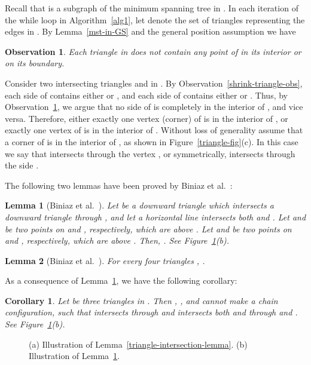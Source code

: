 \documentclass[11pt,a4paper]{article}
\newtheorem{lemma}{Lemma}
\newtheorem{corollary}{Corollary}
\newtheorem{observation}{Observation}
\begin{document}
Recall that  is a subgraph of the minimum spanning tree  in . In each iteration of the {\sf while} loop in Algorithm~\ref{alg1}, let  denote the set of triangles representing the edges in . By Lemma~\ref{mst-in-GS} and the general position assumption we have

\begin{observation}
\label{no-point-in-triangle-obs}
Each triangle  in  does not contain any point of  in its interior or on its boundary.\vspace{-5pt}
\end{observation}

Consider two intersecting triangles  and  in . By Observation~\ref{shrink-triangle-obs}, each side of  contains either  or , and each side of  contains either  or . Thus, by Observation~\ref{no-point-in-triangle-obs}, we argue that no side of  is completely in the interior of , and vice versa. Therefore, either exactly one vertex (corner) of  is in the interior of , or exactly one vertex of  is in the interior of . Without loss of generality assume that a corner of  is in the interior of , as shown in Figure~\ref{triangle-fig}(c). In this case we say that  intersects  through the vertex , or symmetrically,  intersects  through the side . 


The following two lemmas have been proved by Biniaz et al.~\cite{Biniaz2015}:
\begin{lemma}[Biniaz et al.~\cite{Biniaz2015}]
\label{triangle3}
Let  be a downward triangle which intersects a downward triangle  through , and let a horizontal line  intersects both  and . Let  and  be two points on  and , respectively, which are above . Let  and  be two points on  and , respectively, which are above . Then, . See Figure~\ref{triangle-intersection-fig}(b).
\end{lemma}

\begin{lemma}[Biniaz et al.~\cite{Biniaz2015}]
\label{intersection-lemma}
For every four triangles , . 
\end{lemma}

As a consequence of Lemma~\ref{triangle3}, we have the following corollary:
\begin{corollary}
\label{biniaz-cor}
 Let  be three triangles in . Then , , and  cannot make a chain configuration, such that  intersects  through  and  intersects both  and  through  and . See Figure~\ref{triangle-intersection-fig}(b).
\end{corollary}


\begin{figure}[htb]
  \centering
\setlength{\tabcolsep}{0in}
  
  \caption{(a) Illustration of Lemma~\ref{triangle-intersection-lemma}. (b) Illustration of Lemma~\ref{triangle3}.}
  \label{triangle-intersection-fig}
\end{figure}
\end{document}
